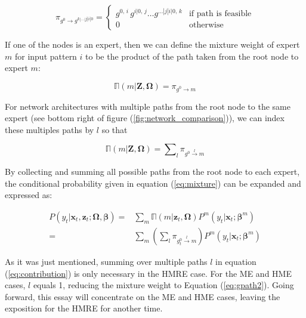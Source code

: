 \documentclass[12pt]{article}
\newcommand{\gateprod}[2]{\pi_{#1 \longrightarrow #2}}
\newcommand{\sumgateprod}[3]{\pi_{#1 \overset{#3}{\longrightarrow} #2}}
\newcommand{\shortsum}[1]{\sum \nolimits_{#1}}
\newcommand{\expmixwt}[0]{\mathbb{\Pi}}
\theoremstyle{definition}
\begin{document}
\begin{equation} \label{eq:gpath}
  \gateprod{g^{0}}{g^{k|\ldots|j|i|0}} =
    \begin{cases} 
       g^{0, \, i} \, g^{i|0, \, j} \ldots g^{\dots|j|i|0, \, k} & \textrm{if path is feasible} \\
       0 & \textrm{otherwise}
    \end{cases}
\end{equation}

If one of the nodes is an expert, then we can define the mixture weight of expert $m$ for input pattern $i$ to be the product of the path taken from the root node to expert $m$:

\begin{equation} \label{eq:gpath2}
  \expmixwt(m | \boldsymbol{Z}, \boldsymbol{\Omega}) = \gateprod{g^{0}}{m}
\end{equation}

For network architectures with multiple paths from the root node to the same expert (see bottom right of figure (\ref{fig:network_comparison})), we can index these multiples paths by $l$ so that

\begin{equation} \label{eq:pathsums}
  \expmixwt(m | \boldsymbol{Z}, \boldsymbol{\Omega}) = \shortsum{l} \sumgateprod{g^{0}}{m}{l} 
\end{equation}

By collecting and summing all possible paths from the root node to each expert, the conditional probability given in equation (\ref{eq:mixture}) can be expanded and expressed as:

\begin{equation} \label{eq:contribution}
  \begin{split}
    P(y_{t}| \boldsymbol{x}_{t}, \boldsymbol{z}_{t}; \boldsymbol{\Omega}, \boldsymbol{\beta}) =& \sum_{m} \expmixwt(m | \boldsymbol{z}_{t}, \boldsymbol{\Omega}) P^{m}(y_{t}| \boldsymbol{x}_{t}; \boldsymbol{\beta}^{m}) \\ 
      =& \sum_{m} \left( \shortsum{l} \sumgateprod{g^{0}_{t}}{m}{l} \right)  P^{m}(y_{t}| \boldsymbol{x}_{t}; \boldsymbol{\beta}^{m})
  \end{split}
\end{equation}

As it was just mentioned, summing over multiple paths $l$ in equation (\ref{eq:contribution}) is only necessary in the HMRE case. For the ME and HME cases, $l$ equals 1, reducing the mixture weight to Equation (\ref{eq:gpath2}). Going forward, this essay will concentrate on the ME and HME cases, leaving the exposition for the HMRE for another time.
\end{document}
